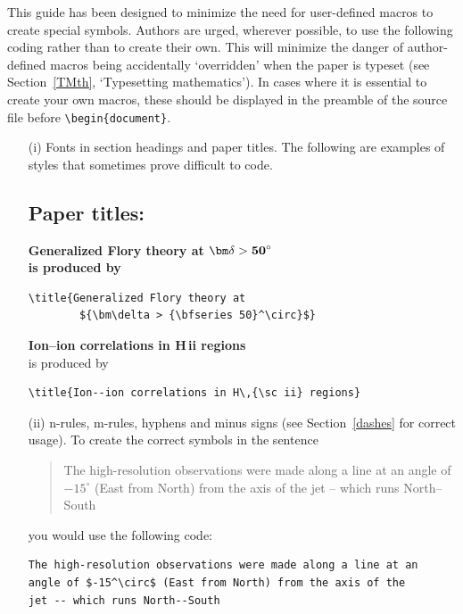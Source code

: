 \documentclass{gCMB2e}
\begin{document}
This guide has been designed to minimize the need for user-defined macros to  create special symbols. Authors
are urged, wherever possible, to use the following coding rather than to create their own. This will minimize
the danger of author-defined macros being accidentally `overridden' when the paper is typeset (see
Section~\ref{TMth}, `Typesetting mathematics'). In cases where it is essential to create your own macros,
these should be displayed in the preamble of the source file before \verb"\begin{document}".
%
\begin{enumerate}
\item[(i)] Fonts in section headings and paper titles. The following are  examples
of styles that sometimes prove difficult to code.


\subsection*{Paper titles:}

\bf{\noindent Generalized Flory theory at ${\bm\delta >
{\bf
   50}^\circ}$}\\

    \noindent\normalfont is produced by
\begin{verbatim}
\title{Generalized Flory theory at
        ${\bm\delta > {\bfseries 50}^\circ}$}
\end{verbatim}
\bigskip

{\bf{\noindent Ion--ion correlations in H\,{\sc ii} regions}}\\

\noindent\normalfont is produced by
%
\begin{verbatim}
\title{Ion--ion correlations in H\,{\sc ii} regions}
\end{verbatim}



\item[(ii)] n-rules, m-rules, hyphens and minus signs (see Section~\ref{dashes} for
correct usage). To create the correct symbols in the sentence
%
\begin{quote}
The high-resolution observations were made along a line at an
angle of $-15^\circ$ (East from North) from the axis of the
jet -- which runs North--South
\end{quote}
you would use the following code:
%
\begin{verbatim}
The high-resolution observations were made along a line at an
angle of $-15^\circ$ (East from North) from the axis of the
jet -- which runs North--South
\end{verbatim}


\end{enumerate}
\end{document}
